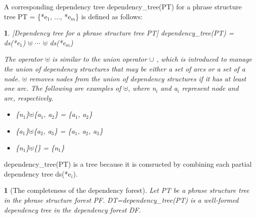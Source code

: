 \documentclass[english]{jnlp_1.4_rep}
\theoremstyle{break}
\newtheorem{theorem}{}[]
\theoremstyle{plain}
\newcommand{\proof}[1]{}
\theoremstyle{plain}
\newtheorem{definition}{}
\begin{document}
A corresponding dependency tree dependency\_tree(PT) for a phrase
structure tree PT = \{*e$_1$, ${\ldots}$, *e$_m$\} is defined as
follows:

\begin{definition}\label{def:DTforPT}[Dependency tree for a phrase structure tree PT]
dependency\_tree(PT) = ds(*e$_1$) ${\uplus}$ ${\cdots}$ ${\uplus}$ ds(*e$_m$) 

\noindent
The operator ${\uplus}$ is similar to the union operator
${\cup}$ , which is introduced to manage the union of dependency
structures that may be either a set of arcs or a set of a
node. ${\uplus}$ removes nodes from the union of dependency structures
if it has at least one arc. The following are examples of ${\uplus}$,
where n$_i$ and a$_i$ represent node and arc, respectively.

\begin{itemize}
\item[] \{n$_1$\}${\uplus}$\{a$_1$, a$_2$\} = \{a$_1$, a$_2$\}
\item[] \{a$_1$\}${\uplus}$\{a$_2$, a$_3$\} = \{a$_1$, a$_2$, a$_3$\}
\item[] \{n$_1$\}${\uplus}$\{\} = \{n$_1$\}
\end{itemize}

\end{definition}

\noindent
dependency\_tree(PT) is a tree because it is consructed
by combining each partial dependency tree ds(*e$_i$).

\begin{theorem}[The completeness of the dependency forest]
\label{the:CompletenessOfPF}
Let PT be a phrase structure tree in the phrase structure forest
PF. DT=dependency\_tree(PT) is a well-formed dependency tree in the
dependency forest DF.

\proof{
From the definition of the dependency forest, DT is included in
DG. Nodes contained in DT and PT have a one-to-one relation, according
to the partial dependency structure condition. Since PT covers the
whole sentence, DT is a well-covered dependency tree. According to the
C-Matrix setting conditions, every two arcs in DT satisfy the
co-occurrence constraint. Therefore, dependency\_tree(PT) is a
well-covering and well-co-occurred dependency tree in DF.\\
}
\end{theorem}
\end{document}

